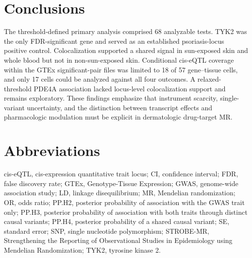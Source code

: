 \section*{Conclusions}

The threshold-defined primary analysis comprised 68 analyzable tests. TYK2 was the only FDR-significant gene and served as an established psoriasis-locus positive control. Colocalization supported a shared signal in sun-exposed skin and whole blood but not in non-sun-exposed skin. Conditional cis-eQTL coverage within the GTEx significant-pair files was limited to 18 of 57 gene--tissue cells, and only 17 cells could be analyzed against all four outcomes. A relaxed-threshold PDE4A association lacked locus-level colocalization support and remains exploratory. These findings emphasize that instrument scarcity, single-variant uncertainty, and the distinction between transcript effects and pharmacologic modulation must be explicit in dermatologic drug-target MR.

\section*{Abbreviations}

cis-eQTL, cis-expression quantitative trait locus; CI, confidence interval; FDR, false discovery rate; GTEx, Genotype-Tissue Expression; GWAS, genome-wide association study; LD, linkage disequilibrium; MR, Mendelian randomization; OR, odds ratio; PP.H2, posterior probability of association with the GWAS trait only; PP.H3, posterior probability of association with both traits through distinct causal variants; PP.H4, posterior probability of a shared causal variant; SE, standard error; SNP, single nucleotide polymorphism; STROBE-MR, Strengthening the Reporting of Observational Studies in Epidemiology using Mendelian Randomization; TYK2, tyrosine kinase 2.

